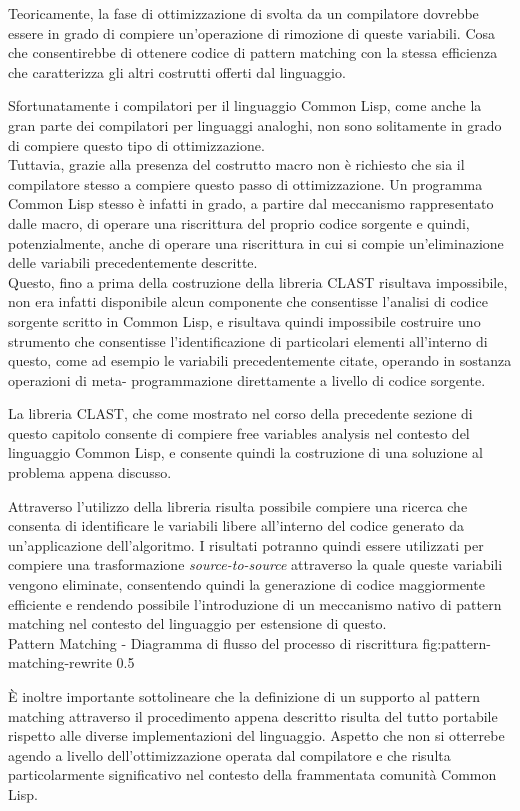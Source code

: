 Teoricamente, la fase di ottimizzazione di svolta da un compilatore dovrebbe
essere in grado di compiere un'operazione di rimozione di queste variabili. Cosa
che consentirebbe di ottenere codice di pattern matching con la stessa
efficienza che caratterizza gli altri costrutti offerti dal linguaggio.

Sfortunatamente i compilatori per il linguaggio Common Lisp, come anche la gran
parte dei compilatori per linguaggi analoghi, non sono solitamente in grado di
compiere questo tipo di ottimizzazione.\\

Tuttavia, grazie alla presenza del costrutto macro non è richiesto che sia il
compilatore stesso a compiere questo passo di ottimizzazione. Un programma
Common Lisp stesso è infatti in grado, a partire dal meccanismo rappresentato
dalle macro, di operare una riscrittura del proprio codice sorgente e quindi,
potenzialmente, anche di operare una riscrittura in cui si compie
un'eliminazione delle variabili precedentemente descritte.\\

Questo, fino a prima della costruzione della libreria CLAST risultava
impossibile, non era infatti disponibile alcun componente che consentisse
l'analisi di codice sorgente scritto in Common Lisp, e risultava quindi
impossibile costruire uno strumento che consentisse l'identificazione di
particolari elementi all'interno di questo, come ad esempio le variabili
precedentemente citate, operando in sostanza operazioni di meta- programmazione
direttamente a livello di codice sorgente.

La libreria CLAST, che come mostrato nel corso della precedente sezione di
questo capitolo consente di compiere free variables analysis nel contesto del
linguaggio Common Lisp, e consente quindi la costruzione di una soluzione al
problema appena discusso.

Attraverso l'utilizzo della libreria risulta possibile compiere una ricerca che
consenta di identificare le variabili libere all'interno del codice generato da
un'applicazione dell'algoritmo. I risultati potranno quindi essere utilizzati
per compiere una trasformazione \textit{source-to-source} attraverso la quale
queste variabili vengono eliminate, consentendo quindi la generazione di codice
maggiormente efficiente e rendendo possibile l'introduzione di un meccanismo
nativo di pattern matching nel contesto del linguaggio per estensione di
questo.\\

      {Pattern Matching - Diagramma di flusso del processo di riscrittura}
      {fig:pattern-matching-rewrite}
      {0.5}

È inoltre importante sottolineare che la definizione di un supporto al pattern
matching attraverso il procedimento appena descritto risulta del tutto portabile
rispetto alle diverse implementazioni del linguaggio. Aspetto che non si
otterrebe agendo a livello dell'ottimizzazione operata dal compilatore e che
risulta particolarmente significativo nel contesto della frammentata comunità
Common Lisp.
